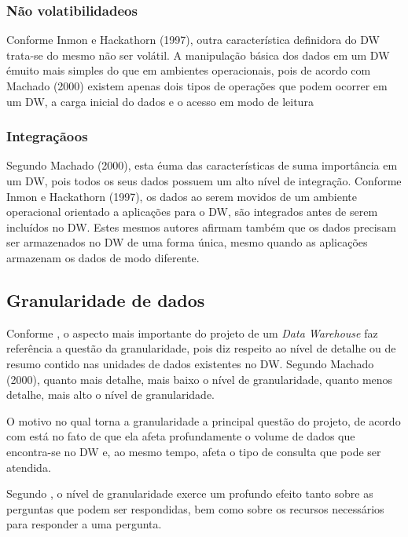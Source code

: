 \subsubsection{N\~{a}o volatibilidadeos}

Conforme Inmon e Hackathorn (1997), outra caracter\'{i}stica definidora do DW trata-se do mesmo n\~{a}o ser vol\'{a}til. A manipula\c{c}\~{a}o b\'{a}sica dos dados em um DW \'{e}muito mais simples do que em ambientes operacionais, pois de acordo com Machado (2000) existem apenas dois tipos de opera\c{c}\~{o}es que podem ocorrer em um DW, a carga inicial do dados e o acesso em modo de leitura

\subsubsection{Integra\c{c}\~{a}oos}

Segundo Machado (2000), esta \'{e}uma das caracter\'{i}sticas de suma importância em um DW, pois todos os seus dados possuem um alto n\'{i}vel de integra\c{c}\~{a}o.
Conforme Inmon e Hackathorn (1997), os dados ao serem movidos de um ambiente operacional orientado a aplica\c{c}\~{o}es para o DW, s\~{a}o integrados antes de serem inclu\'{i}dos no DW. Estes mesmos autores afirmam tamb\'{e}m que os dados precisam ser armazenados no DW de uma forma única, mesmo quando as aplica\c{c}\~{o}es armazenam os dados de modo diferente.

\subsection{Granularidade de dados}

Conforme \cite{si-inmon-1997}, o aspecto mais importante do projeto de um \textit{Data Warehouse} faz referência a quest\~{a}o da granularidade, pois diz respeito ao n\'{i}vel de detalhe ou de resumo contido nas unidades de dados existentes no DW. Segundo Machado (2000), quanto mais detalhe, mais baixo o n\'{i}vel de granularidade, quanto menos detalhe, mais alto o n\'{i}vel de granularidade.

O motivo no qual torna a granularidade a principal quest\~{a}o do projeto, de acordo com \cite{si-inmon-1997} est\'{a} no fato de que ela afeta profundamente o volume de dados que encontra-se no DW e, ao mesmo tempo, afeta o tipo de consulta que pode ser atendida.

Segundo \cite{si-inmon-1997}, o n\'{i}vel de granularidade exerce um profundo efeito tanto sobre as perguntas que podem ser respondidas, bem como sobre os recursos necess\'{a}rios para responder a uma pergunta.

